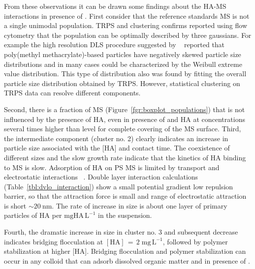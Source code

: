 \documentclass[journal=langd5,manuscript=article]{achemso}
\begin{document}

From these observations it can be drawn some findings  about the HA-MS interactions in presence of .
First consider that the reference standards MS is not a single unimodal population.
TRPS and clustering confirms reported using flow cytometry that the population can be optimally described by three gaussians.
 For example the  high resolution DLS procedure suggested by
 ~\citeauthor{Bryant2003AccurateSuspensions}\cite{Bryant2003AccurateSuspensions} 
reported  that poly(methyl methacrylate)-based particles have negatively
skewed particle size distributions and in many cases could be characterized
by the Weibull extreme value distribution. This type of distribution also
was found by fitting the overall particle size distribution obtained by TRPS. However, statistical clustering on TRPS data can resolve different components.


Second, there is a fraction of MS (Figure~\ref{fgr:boxplot_populations})
that is not influenced by the presence of HA, even in presence of 
and HA at concentrations several times higher than level for complete
covering of the MS surface.
Third, the intermediate component (cluster no. 2) clearly indicates  an
increase in particle size associated with the [HA] and
contact time. The coexistence of different sizes and the
slow  growth rate indicate that the kinetics of HA binding
to MS is slow. Adsorption of HA on PS MS is limited by
transport and electrostatic interactions~ \cite{doi:10.1021/es981236u}.
Double layer interaction calculations (Table~\ref{tbl:dvlo_interaction}) show a small potential gradient  low  repulsion barrier,
so that the attraction force  is small  and range of electrostatic attraction is short $\sim 20~\mathrm{nm}$.
The rate of increase in size is about one  layer of primary particles of HA per $\mathrm{mg HA\,L^{-1}}$ in the suspension.

Fourth, the dramatic increase in size in cluster no. 3 
and subsequent decrease indicates bridging flocculation at 
$\mathrm{[HA] \,=\, 2\;mg\,L^{-1}}$, followed by polymer stabilization at higher [HA]. %
Bridging flocculation and polymer stabilization can occur in any colloid that can adsorb dissolved organic matter and in presence of .
\end{document}

